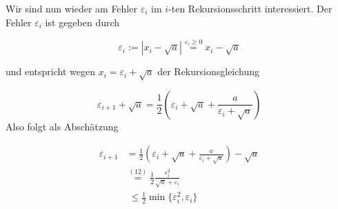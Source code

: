 \documentclass[11pt,a4paper,ngerman]{article}
\begin{document}
Wir sind nun wieder am Fehler $\varepsilon_i$ im $i$-ten Rekursionsschritt interessiert. 
Der Fehler $\varepsilon_i$ ist gegeben durch

\begin{equation}
\varepsilon_i := |x_i - \sqrt{a}| \stackrel{\varepsilon_i \geq 0}{=} x_i - \sqrt{a}
\end{equation}

und entspricht wegen $x_i = \varepsilon_i + \sqrt{a}$
der Rekursionsgleichung

\begin{equation}
\varepsilon_{i+1} + \sqrt{a} = \frac{1}{2} \left(\varepsilon_i + \sqrt{a} + \frac{a}{\varepsilon_i + \sqrt{a}} \right)
\end{equation}
Also folgt als Abschätzung 

\begin{equation}\begin{split}
\varepsilon_{i+1} &=  \frac{1}{2} \left(\varepsilon_i + \sqrt{a} + \frac{a}{\varepsilon_i + \sqrt{a}} \right) - \sqrt{a} \\
  &\stackrel{(12)}{=} \frac{1}{2} \frac{\varepsilon_i^2}{\sqrt{a} + \varepsilon_i} \\
  &\; \leq \frac{1}{2} \min \{\varepsilon_i^2, \varepsilon_i \}
\end{split}\end{equation}


\label{LastPage}
\end{document}
